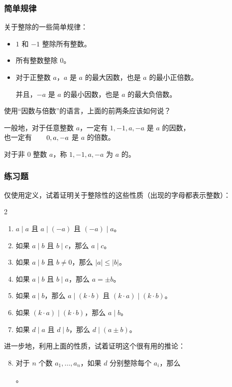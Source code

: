 \begin{frame}
  \frametitle{简单规律}
  关于整除的一些简单规律：
  \pause
  \begin{itemize}
    \item $1$ 和 $-1$ 整除所有整数。
    \pause
    \item 所有整数整除 $0$。
    \pause
    \item 对于\alert{正}整数 $a$，$a$ 是 $a$ 的最大因数，也是 $a$ 的最小\alert{正}倍数。
    
    并且，$-a$ 是 $a$ 的最小因数，也是 $a$ 的最大负倍数。
  \end{itemize}
  \pause
  使用“因数与倍数”的语言，上面的前两条应该如何说？
  \pause
  
  \emptyline
  一般地，对于任意整数 $a$，一定有 $1, -1, a, -a$ 是 $a$ 的因数，\\
  \-\hspace{10em}\hphantom{ $a$}也一定有 $\hphantom{0, -{}}0, a, -a$ 是 $a$ 的倍数。
  
  对于非 $0$ 整数 $a$，称 $1, -1, a, -a$ 为 $a$ 的。
\end{frame}
\begin{frame}
  \frametitle{练习题}
  仅使用定义，试着证明关于整除性的这些性质（出现的字母都表示整数）：
  \pause
  \begin{mymulticols}[l][l]{2}
    \begin{enumerate}
      \item $a \mid a$ 且 $a \mid (-a)$ 且 $(-a) \mid a$。
      \pause
      \item 如果 $a \mid b$ 且 $b \mid c$，那么 $a \mid c$。
    \end{enumerate}
  \end{mymulticols}
  \pause
  \begin{enumerate}
    \setcounter{enumi}{2}
    \item 如果 $a \mid b$ 且 $b \ne 0$，那么 $\lvert a \rvert \le \lvert b \rvert$。
    \pause
    \item 如果 $a \mid b$ 且 $b \mid a$，那么 $a = \pm b$。
    \pause
    \item 如果 $a \mid b$，那么 $a \mid (k \cdot b)$ 且 $(k \cdot a) \mid (k \cdot b)$。
    \pause
    \item 如果 $(k \cdot a) \mid (k \cdot b)$，那么 $a \mid b$。
    \pause
    \item 如果 $d \mid a$ 且 $d \mid b$，那么 $d \mid (a \pm b)$。
  \end{enumerate}
  \pause
  进一步地，利用上面的性质，试着证明这个很有用的推论：
  \pause
  \begin{enumerate}
    \setcounter{enumi}{7}
    \item 对于 $n$ 个数 $a_1, \ldots, a_n$，如果 $d$ 分别整除每个 $a_i$，那么
    \begin{center}
      。
    \end{center}
  \end{enumerate}
\end{frame}
